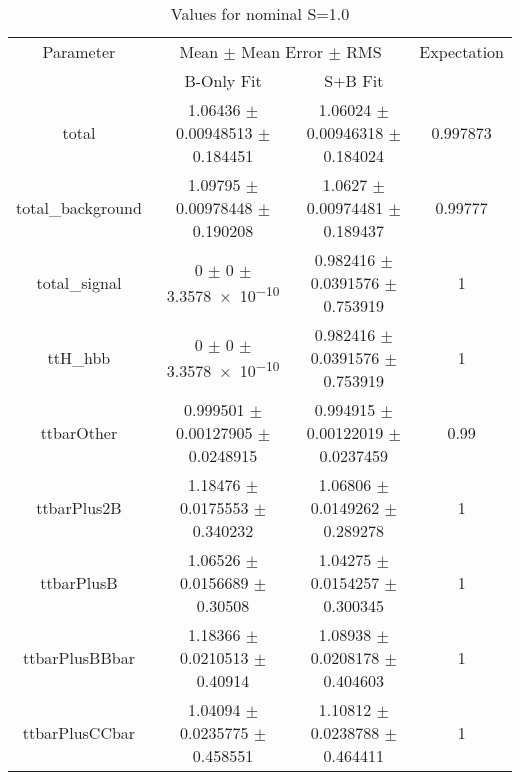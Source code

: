 \begin{table}
\centering
\caption{Values for nominal S=1.0}
\begin{tabular}{cccc}
\toprule
Parameter & \multicolumn{2}{c}{Mean $\pm$ Mean Error $\pm$ RMS} & Expectation\\
 & B-Only Fit & S+B Fit & \\
\midrule
total & \num{1.06436} $\pm$ \num{0.00948513} $\pm$ \num{0.184451} & \num{1.06024} $\pm$ \num{0.00946318} $\pm$ \num{0.184024} & \num{0.997873}\\
total\_background & \num{1.09795} $\pm$ \num{0.00978448} $\pm$ \num{0.190208} & \num{1.0627} $\pm$ \num{0.00974481} $\pm$ \num{0.189437} & \num{0.99777}\\
total\_signal & \num{0} $\pm$ \num{0} $\pm$ \num{3.3578e-10} & \num{0.982416} $\pm$ \num{0.0391576} $\pm$ \num{0.753919} & \num{1}\\
ttH\_hbb & \num{0} $\pm$ \num{0} $\pm$ \num{3.3578e-10} & \num{0.982416} $\pm$ \num{0.0391576} $\pm$ \num{0.753919} & \num{1}\\
ttbarOther & \num{0.999501} $\pm$ \num{0.00127905} $\pm$ \num{0.0248915} & \num{0.994915} $\pm$ \num{0.00122019} $\pm$ \num{0.0237459} & \num{0.99}\\
ttbarPlus2B & \num{1.18476} $\pm$ \num{0.0175553} $\pm$ \num{0.340232} & \num{1.06806} $\pm$ \num{0.0149262} $\pm$ \num{0.289278} & \num{1}\\
ttbarPlusB & \num{1.06526} $\pm$ \num{0.0156689} $\pm$ \num{0.30508} & \num{1.04275} $\pm$ \num{0.0154257} $\pm$ \num{0.300345} & \num{1}\\
ttbarPlusBBbar & \num{1.18366} $\pm$ \num{0.0210513} $\pm$ \num{0.40914} & \num{1.08938} $\pm$ \num{0.0208178} $\pm$ \num{0.404603} & \num{1}\\
ttbarPlusCCbar & \num{1.04094} $\pm$ \num{0.0235775} $\pm$ \num{0.458551} & \num{1.10812} $\pm$ \num{0.0238788} $\pm$ \num{0.464411} & \num{1}\\
\bottomrule
\end{tabular}
\end{table}